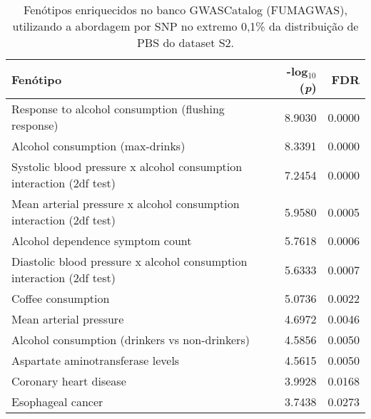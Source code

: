 \begin{table}[!htbp]
\centering

\begin{tabular}[t]{lrr}

\toprule
Fenótipo & -log$_{10}$(\emph{p}) & FDR\\
\midrule
Response to alcohol consumption (flushing response) & 8.9030 & 0.0000\\
Alcohol consumption (max-drinks) & 8.3391 & 0.0000\\
Systolic blood pressure x alcohol consumption interaction (2df test) & 7.2454 & 0.0000\\
Mean arterial pressure x alcohol consumption interaction (2df test) & 5.9580 & 0.0005\\
Alcohol dependence symptom count & 5.7618 & 0.0006\\
Diastolic blood pressure x alcohol consumption interaction (2df test) & 5.6333 & 0.0007\\
Coffee consumption & 5.0736 & 0.0022\\
Mean arterial pressure & 4.6972 & 0.0046\\
Alcohol consumption (drinkers vs non-drinkers) & 4.5856 & 0.0050\\
Aspartate aminotransferase levels & 4.5615 & 0.0050\\
Coronary heart disease & 3.9928 & 0.0168\\
Esophageal cancer & 3.7438 & 0.0273\\
\bottomrule

\end{tabular}

\caption{Fenótipos enriquecidos no banco GWASCatalog (FUMAGWAS), utilizando a abordagem por SNP no extremo 0,1\% da distribuição de PBS do dataset S2.}
\label{tab:ds2_fumagwas_pbs_persnp}

\end{table}